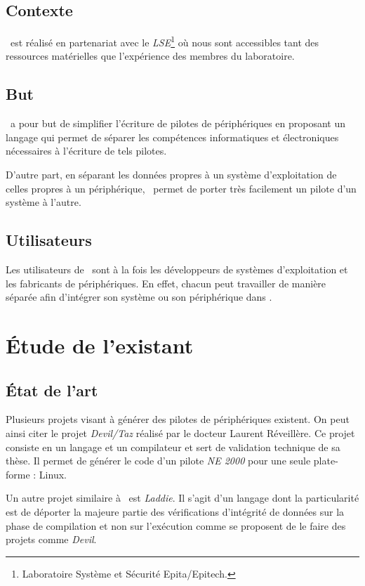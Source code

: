\documentclass[francais]{rtxreport}
\begin{document}
\section{Contexte}
\rtx\ est réalisé en partenariat avec le \emph{LSE}\footnote{Laboratoire
Système et Sécurité Epita/Epitech.} où nous sont accessibles tant des
ressources matérielles que l'expérience des membres du laboratoire.

\section{But}
\rtx\ a pour but de simplifier l'écriture de pilotes de périphériques en
proposant un langage qui permet de séparer les compétences informatiques et
électroniques nécessaires à l'écriture de tels pilotes.

D'autre part, en séparant les données propres à un système d'exploitation de
celles propres à un périphérique, \rtx\ permet de porter très facilement un
pilote d'un système à l'autre.

\section{Utilisateurs}
Les utilisateurs de \rtx\ sont à la fois les développeurs de systèmes
d'exploitation et les fabricants de périphériques. En effet, chacun peut
travailler de manière séparée afin d'intégrer son système ou son périphérique
dans \rtx.

\chapter{Étude de l'existant}

\section{État de l'art}
Plusieurs projets visant à générer des pilotes de périphériques existent. On
peut ainsi citer le projet \emph{Devil/Taz} réalisé par le docteur Laurent
Réveillère. Ce projet consiste en un langage et un compilateur et sert de
validation technique de sa thèse. Il permet de générer le code d'un pilote
\emph{NE 2000} pour une seule plate-forme : Linux.

Un autre projet similaire à \rtx\ est \emph{Laddie}. Il s'agit d'un langage dont
la particularité est de déporter la majeure partie des vérifications d'intégrité
de données sur la phase de compilation et non sur l'exécution comme se proposent
de le faire des projets comme \emph{Devil}.
\end{document}

